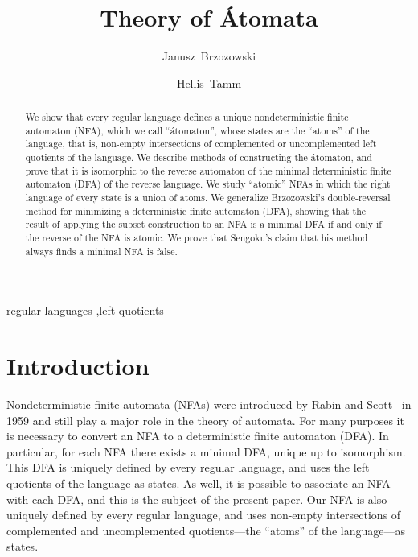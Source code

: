 \documentclass[preprint,12pt]{elsarticle}
\begin{document}
\begin{frontmatter}

\title{Theory of \'Atomata}

\author[JB]{Janusz~Brzozowski}
\author[HT]{Hellis~Tamm}
\address[JB]{David R. Cheriton School of Computer Science, University of Waterloo,
Waterloo, ON, Canada N2L 3G1}
\address[HT]{Institute of Cybernetics, Tallinn University of Technology,
Akadeemia tee 21, 12618 Tallinn, Estonia}

\begin{abstract}
We show that every regular language defines a unique nondeterministic finite 
automaton (NFA), which we call ``\'atomaton'', whose states are the ``atoms'' of 
the language, that is, non-empty intersections of complemented or uncomplemented 
left quotients of the language.
We describe methods of constructing the \'atomaton, and prove that it is 
isomorphic to the reverse automaton of the minimal deterministic finite automaton 
(DFA) of the reverse language.
We study ``atomic'' NFAs in which the right language of every state 
is a union of atoms. We generalize Brzozowski's double-reversal method for 
minimizing a deterministic finite automaton (DFA), showing that the result of 
applying the subset construction to an NFA is a minimal DFA if and only if 
the reverse of the NFA is atomic.
We prove that Sengoku's claim that his method always finds a minimal NFA is false.
\end{abstract}

\begin{keyword}
regular languages \sep left quotients
\end{keyword}

\end{frontmatter}

\section{Introduction}

Nondeterministic finite automata (NFAs) were introduced by 
Rabin and Scott~\cite{RaSc59} in 1959 and still
play a major role in the theory of automata. 
For many purposes it is necessary to convert an NFA to a deterministic finite automaton (DFA).
In particular, for each NFA there exists a minimal DFA, unique up to isomorphism.
This DFA is uniquely defined by every regular language, and uses the left quotients 
of the language as states. As well, it is  possible to associate an NFA with each DFA, 
and this is the subject of the present paper. Our NFA is also uniquely defined by 
every regular language, and uses non-empty intersections of complemented and 
uncomplemented quotients---the ``atoms'' of the language---as states. 
\end{document}
